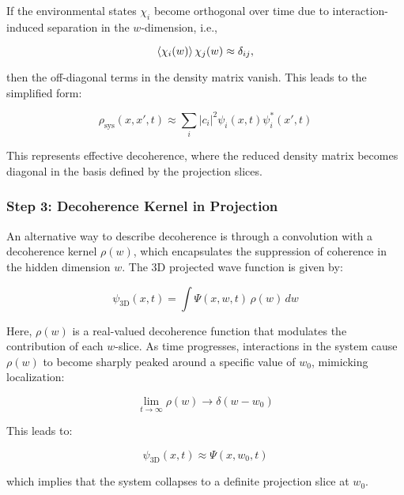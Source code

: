 \documentclass[12pt]{article}
\begin{document}
If the environmental states \( \chi_i \) become orthogonal over time due to interaction-induced separation in the \( w \)-dimension, i.e.,

\begin{equation}
\braket{\chi_i(w)}{\chi_j(w)} \approx \delta_{ij},
\end{equation}

then the off-diagonal terms in the density matrix vanish. This leads to the simplified form:

\begin{equation}
\rho_{\text{sys}}(x, x', t) \approx \sum_i |c_i|^2 \psi_i(x, t) \psi_i^*(x', t)
\label{eq:diagonal_density_matrix}
\end{equation}

This represents effective decoherence, where the reduced density matrix becomes diagonal in the basis defined by the projection slices.

\subsubsection*{Step 3: Decoherence Kernel in Projection}

An alternative way to describe decoherence is through a convolution with a decoherence kernel \( \rho(w) \), which encapsulates the suppression of coherence in the hidden dimension \( w \). The 3D projected wave function is given by:

\begin{equation}
\psi_{\text{3D}}(x, t) = \int \Psi(x, w, t) \, \rho(w) \, dw
\label{eq:projected_wave_function}
\end{equation}

Here, \( \rho(w) \) is a real-valued decoherence function that modulates the contribution of each \( w \)-slice. As time progresses, interactions in the system cause \( \rho(w) \) to become sharply peaked around a specific value of \( w_0 \), mimicking localization:

\begin{equation}
\lim_{t \to \infty} \rho(w) \to \delta(w - w_0)
\label{eq:localized_decoherence}
\end{equation}

This leads to:

\begin{equation}
\psi_{\text{3D}}(x, t) \approx \Psi(x, w_0, t)
\label{eq:localized_wave_function}
\end{equation}

which implies that the system collapses to a definite projection slice at \( w_0 \).
\end{document}
